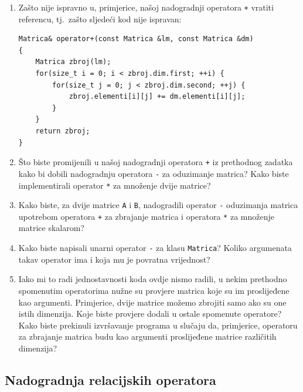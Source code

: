 \begin{razmisljanje}
    \begin{enumerate}
        \item 
        Zašto nije ispravno u, primjerice, našoj nadogradnji operatora \texttt{+}
        vratiti referencu, tj.\ zašto sljedeći kod nije ispravan:

        \begin{verbatim}
Matrica& operator+(const Matrica &lm, const Matrica &dm) 
{
    Matrica zbroj(lm);
    for(size_t i = 0; i < zbroj.dim.first; ++i) {
        for(size_t j = 0; j < zbroj.dim.second; ++j) {
            zbroj.elementi[i][j] += dm.elementi[i][j];
        }
    }
    return zbroj;
}
    \end{verbatim}

    \item 
    Što biste promijenili u našoj nadogradnji operatora \texttt{+} iz prethodnog zadatka
    kako bi dobili nadogradnju operatora \texttt{-} za oduzimanje matrica?
    Kako biste implementirali operator \texttt{*} za množenje dvije matrice?

    \item 
    Kako biste, za dvije matrice \texttt{A} i \texttt{B},
    nadogradili operator \texttt{-} oduzimanja matrica
    upotrebom operatora \texttt{+} za zbrajanje
    matrica i operatora \texttt{*} za množenje matrice skalarom?

    \item 
    Kako biste napisali unarni operator \texttt{-} za klasu \texttt{Matrica}?
    Koliko argumenata takav operator ima i koja mu je povratna vrijednost?

    \item 
    Iako mi to radi jednostavnosti koda ovdje nismo radili,
    u nekim prethodno spomenutim operatorima nužne
    su provjere matrica koje su im proslijeđene kao argumenti.
    Primjerice, dvije matrice možemo zbrojiti samo ako su one istih dimenzija.
    Koje biste provjere dodali u ostale spomenute operatore?
    Kako biste prekinuli izvršavanje programa u slučaju da, primjerice,
    operatoru za zbrajanje matrica budu kao argumenti proslijeđene matrice različitih dimenzija?
    \end{enumerate}
\end{razmisljanje}


\subsection{Nadogradnja relacijskih operatora}


